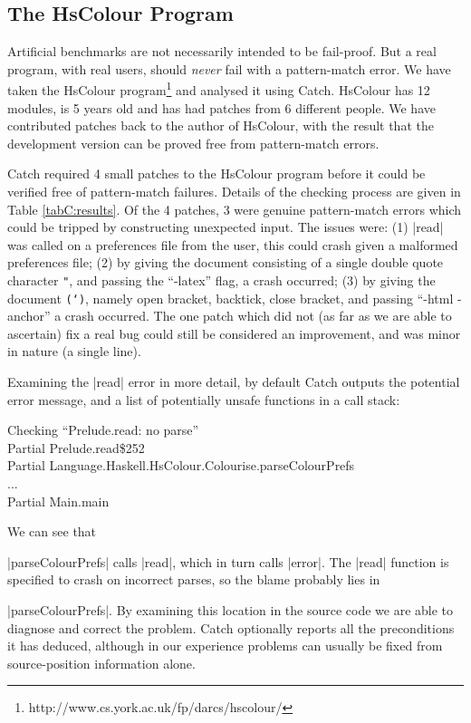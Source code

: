\subsection{The HsColour Program}
\label{secC:hscolour}

Artificial benchmarks are not necessarily intended to be fail-proof. But a real program, with real users, should \textit{never} fail with a pattern-match error. We have taken the HsColour program\footnote{http://www.cs.york.ac.uk/fp/darcs/hscolour/} and analysed it using Catch. HsColour has 12 modules, is 5 years old and has had patches from 6 different people.
We have contributed patches back to the author of HsColour, with the result that the development version can be proved free from pattern-match errors.

Catch required 4 small patches to the HsColour program before it could be verified free of pattern-match failures. Details of the checking process are given in Table \ref{tabC:results}. Of the 4 patches, 3 were genuine pattern-match errors which could be tripped by constructing unexpected input. The issues were: (1) |read| was called on a preferences file from the user, this could crash given a malformed preferences file; (2) by giving the document consisting of a single double quote character \texttt{"}, and passing the ``-latex'' flag, a crash occurred; (3) by giving the document \texttt{(`)}, namely open bracket, backtick, close bracket, and passing ``-html -anchor'' a crash occurred. The one patch which did not (as far as we are able to ascertain) fix a real bug could still be considered an improvement, and was minor in nature (a single line).

Examining the |read| error in more detail, by default Catch outputs the potential error message, and a list of potentially unsafe functions in a call stack:

\begin{console}
Checking ``Prelude.read: no parse'' \\
Partial Prelude.read\$252 \\
Partial Language.Haskell.HsColour.Colourise.parseColourPrefs \\
... \\
Partial Main.main
\end{console}

We can see that \ignore|parseColourPrefs| calls |read|, which in turn calls |error|. The |read| function is specified to crash on incorrect parses, so the blame probably lies in \ignore|parseColourPrefs|. By examining this location in the source code we are able to diagnose and correct the problem. Catch optionally reports all the preconditions it has deduced, although in our experience problems can usually be fixed from source-position information alone.

